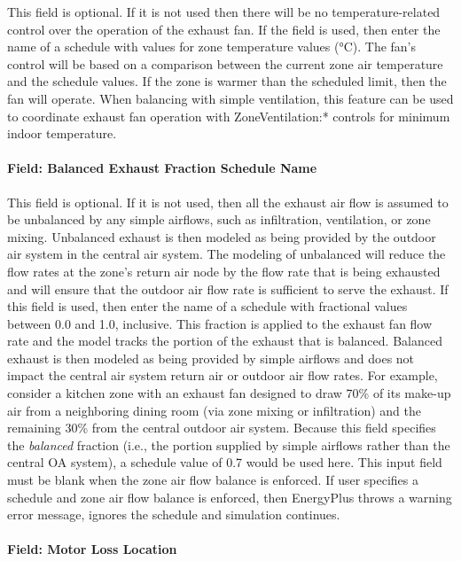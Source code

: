 This field is optional. If it is not used then there will be no temperature-related control over the operation of the exhaust fan. If the field is used, then enter the name of a schedule with values for zone temperature values (\si{\celsius}). The fan's control will be based on a comparison between the current zone air temperature and the schedule values. If the zone is warmer than the scheduled limit, then the fan will operate. When balancing with simple ventilation, this feature can be used to coordinate exhaust fan operation with ZoneVentilation:* controls for minimum indoor temperature.

\paragraph{Field: Balanced Exhaust Fraction Schedule Name}\label{field-balanced-exhaust-fraction-schedule-name}

This field is optional. If it is not used, then all the exhaust air flow is assumed to be unbalanced by any simple airflows, such as infiltration, ventilation, or zone mixing. Unbalanced exhaust is then modeled as being provided by the outdoor air system in the central air system. The modeling of unbalanced will reduce the flow rates at the zone's return air node by the flow rate that is being exhausted and will ensure that the outdoor air flow rate is sufficient to serve the exhaust. If this field is used, then enter the name of a schedule with fractional values between 0.0 and 1.0, inclusive. This fraction is applied to the exhaust fan flow rate and the model tracks the portion of the exhaust that is balanced. Balanced exhaust is then modeled as being provided by simple airflows and does not impact the central air system return air or outdoor air flow rates. For example, consider a kitchen zone with an exhaust fan designed to draw 70\% of its make-up air from a neighboring dining room (via zone mixing or infiltration) and the remaining 30\% from the central outdoor air system. Because this field specifies the \emph{balanced} fraction (i.e., the portion supplied by simple airflows rather than the central OA system), a schedule value of 0.7 would be used here. This input field must be blank when the zone air flow balance is enforced. If user specifies a schedule and zone air flow balance is enforced, then EnergyPlus throws a warning error message, ignores the schedule and simulation continues.

\paragraph{Field: Motor Loss Location}\label{field-motor-loss-location}

